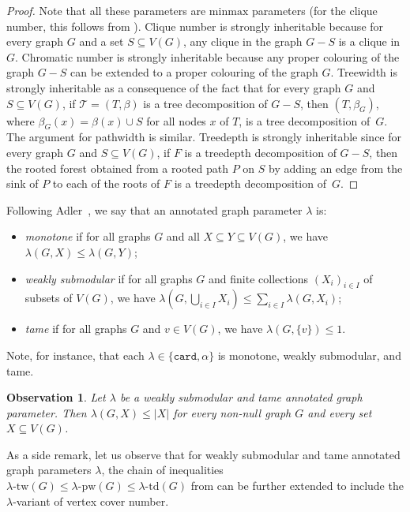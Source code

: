 \documentclass[11pt]{article}
\newcommand{\td}{\mathrm{td}}
\newcommand{\tw}{\mathrm{tw}}
\newcommand{\minmax}{\mathrm{minmax}}
\newcommand{\pw}{\mathrm{pw}}
\theoremstyle{plain}
\newtheorem{observation}[theorem]{Observation}
\theoremstyle{definition}
\theoremstyle{remark}
\numberwithin{equation}{section}
\begin{document}
\begin{proof}
Note that all these parameters are $\minmax$ parameters (for the clique number, this follows from ).
Clique number is strongly inheritable because for every graph $G$ and a set $S\subseteq V(G)$, any clique in the graph $G-S$ is a clique in $G$.
Chromatic number is strongly inheritable because any proper colouring of the graph $G-S$ can be extended to a proper colouring of the graph $G$.
Treewidth is strongly inheritable as a consequence of the fact that for every graph $G$ and $S\subseteq V(G)$, if $\mathcal{T} =(T,\beta)$ is a tree decomposition of $G-S$, then $(T,\beta_G)$, where $\beta_G(x) = \beta(x)\cup S$ for all nodes $x$ of $T$, is a tree decomposition of~$G$.
The argument for pathwidth is similar.
Treedepth is strongly inheritable since for every graph $G$ and $S\subseteq V(G)$, if $F$ is a treedepth decomposition of $G-S$, then the rooted forest obtained from a rooted path $P$ on $S$ by adding an edge from the sink of $P$ to each of the roots of $F$ is a treedepth decomposition of~$G$.
\end{proof}

Following Adler~\cite{adler2006width}, we say that an annotated graph parameter $\lambda$ is:\label{def:monotone-wekly-submod-tame}
\begin{itemize}
    \item \emph{monotone} if for all graphs $G$ and all $X\subseteq Y\subseteq V(G)$, we have $\lambda(G,X)\le \lambda(G,Y)$;
    \item \emph{weakly submodular} if for all graphs $G$ and finite collections $(X_i)_{i\in I}$ of subsets of $V(G)$, we have $\lambda\left(G,\bigcup_{i\in I}X_i\right)\le \sum_{i\in I}\lambda(G,X_i)$;
    \item \emph{tame} if for all graphs $G$ and $v\in V(G)$, we have $\lambda(G,\{v\})\le 1$.
\end{itemize}
Note, for instance, that each $\lambda\in \{\texttt{card},\alpha\}$ is monotone, weakly submodular, and tame.

\begin{observation}\label{at-most-card}
Let $\lambda$ be a weakly submodular and tame annotated graph parameter.
Then \hbox{$\lambda(G,X)\le |X|$} for every non-null graph $G$ and every set $X\subseteq V(G)$.
\end{observation}

As a side remark, let us observe that for weakly submodular and tame annotated graph parameters $\lambda$, the chain of inequalities ${\lambda\text{-}\tw(G)\le \lambda\text{-}\pw(G)\le \lambda\text{-}\td(G)}$ from  can be further extended to include the $\lambda$-variant of vertex cover number.
\end{document}
